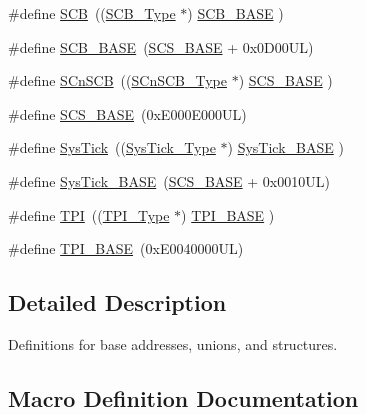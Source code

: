 \begin{DoxyCompactItemize}
\item 
\#define \hyperlink{group__CMSIS__core__base_gaaaf6477c2bde2f00f99e3c2fd1060b01}{S\+CB}~((\hyperlink{structSCB__Type}{S\+C\+B\+\_\+\+Type}       $\ast$)     \hyperlink{group__CMSIS__core__base_gad55a7ddb8d4b2398b0c1cfec76c0d9fd}{S\+C\+B\+\_\+\+B\+A\+SE}      )
\item 
\#define \hyperlink{group__CMSIS__core__base_gad55a7ddb8d4b2398b0c1cfec76c0d9fd}{S\+C\+B\+\_\+\+B\+A\+SE}~(\hyperlink{group__CMSIS__core__base_ga3c14ed93192c8d9143322bbf77ebf770}{S\+C\+S\+\_\+\+B\+A\+SE} +  0x0\+D00\+U\+L)
\item 
\#define \hyperlink{group__CMSIS__core__base_ga9fe0cd2eef83a8adad94490d9ecca63f}{S\+Cn\+S\+CB}~((\hyperlink{structSCnSCB__Type}{S\+Cn\+S\+C\+B\+\_\+\+Type}    $\ast$)     \hyperlink{group__CMSIS__core__base_ga3c14ed93192c8d9143322bbf77ebf770}{S\+C\+S\+\_\+\+B\+A\+SE}      )
\item 
\#define \hyperlink{group__CMSIS__core__base_ga3c14ed93192c8d9143322bbf77ebf770}{S\+C\+S\+\_\+\+B\+A\+SE}~(0x\+E000\+E000\+U\+L)
\item 
\#define \hyperlink{group__CMSIS__core__base_gacd96c53beeaff8f603fcda425eb295de}{Sys\+Tick}~((\hyperlink{structSysTick__Type}{Sys\+Tick\+\_\+\+Type}   $\ast$)     \hyperlink{group__CMSIS__core__base_ga58effaac0b93006b756d33209e814646}{Sys\+Tick\+\_\+\+B\+A\+SE}  )
\item 
\#define \hyperlink{group__CMSIS__core__base_ga58effaac0b93006b756d33209e814646}{Sys\+Tick\+\_\+\+B\+A\+SE}~(\hyperlink{group__CMSIS__core__base_ga3c14ed93192c8d9143322bbf77ebf770}{S\+C\+S\+\_\+\+B\+A\+SE} +  0x0010\+U\+L)
\item 
\#define \hyperlink{group__CMSIS__core__base_ga8b4dd00016aed25a0ea54e9a9acd1239}{T\+PI}~((\hyperlink{structTPI__Type}{T\+P\+I\+\_\+\+Type}       $\ast$)     \hyperlink{group__CMSIS__core__base_ga2b1eeff850a7e418844ca847145a1a68}{T\+P\+I\+\_\+\+B\+A\+SE}      )
\item 
\#define \hyperlink{group__CMSIS__core__base_ga2b1eeff850a7e418844ca847145a1a68}{T\+P\+I\+\_\+\+B\+A\+SE}~(0x\+E0040000\+U\+L)
\end{DoxyCompactItemize}


\subsection{Detailed Description}
Definitions for base addresses, unions, and structures. 



\subsection{Macro Definition Documentation}

